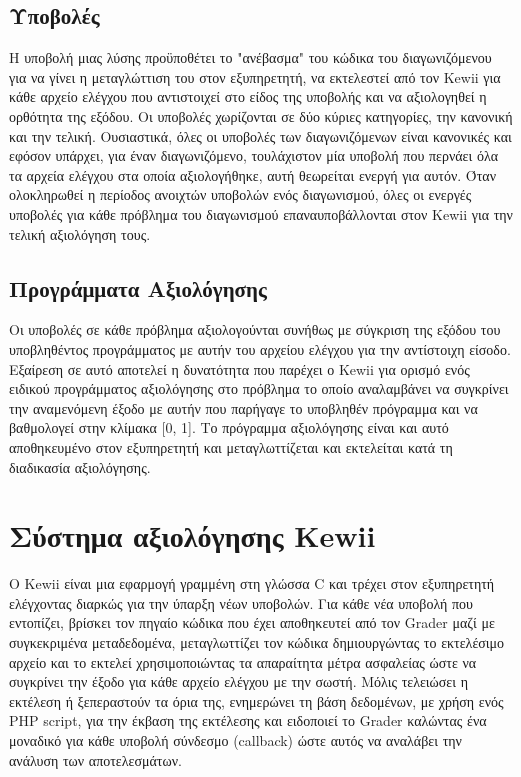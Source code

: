 \documentclass[diploma]{softlab-thesis}
\begin{document}
\subsection{Υποβολές}

Η υποβολή μιας λύσης προϋποθέτει το "ανέβασμα" του κώδικα του διαγωνιζόμενου για
να γίνει η μεταγλώττιση του στον εξυπηρετητή, να εκτελεστεί από τον Kewii για
κάθε αρχείο ελέγχου που αντιστοιχεί στο είδος της υποβολής και να αξιολογηθεί η
ορθότητα της εξόδου. Οι υποβολές χωρίζονται σε δύο κύριες κατηγορίες, την
κανονική και την τελική. Ουσιαστικά, όλες οι υποβολές των διαγωνιζόμενων είναι
κανονικές και εφόσον υπάρχει, για έναν διαγωνιζόμενο, τουλάχιστον μία υποβολή
που περνάει όλα τα αρχεία ελέγχου στα οποία αξιολογήθηκε, αυτή θεωρείται ενεργή
για αυτόν. Όταν ολοκληρωθεί η περίοδος ανοιχτών υποβολών ενός διαγωνισμού, όλες
οι ενεργές υποβολές για κάθε πρόβλημα του διαγωνισμού επαναυποβάλλονται στον
Kewii για την τελική αξιολόγηση τους.

\subsection{Προγράμματα Αξιολόγησης}

Οι υποβολές σε κάθε πρόβλημα αξιολογούνται συνήθως με σύγκριση της εξόδου του
υποβληθέντος προγράμματος με αυτήν του αρχείου ελέγχου για την αντίστοιχη
είσοδο. Εξαίρεση σε αυτό αποτελεί η δυνατότητα που παρέχει ο Kewii για ορισμό
ενός ειδικού προγράμματος αξιολόγησης στο πρόβλημα το οποίο αναλαμβάνει να
συγκρίνει την αναμενόμενη έξοδο με αυτήν που παρήγαγε το υποβληθέν πρόγραμμα
και να βαθμολογεί στην κλίμακα [0, 1]. Το πρόγραμμα αξιολόγησης είναι και αυτό
αποθηκευμένο στον εξυπηρετητή και μεταγλωττίζεται και εκτελείται κατά τη
διαδικασία αξιολόγησης.

\section{Σύστημα αξιολόγησης Kewii}

Ο Kewii είναι μια εφαρμογή γραμμένη στη γλώσσα C και τρέχει στον εξυπηρετητή
ελέγχοντας διαρκώς για την ύπαρξη νέων υποβολών. Για κάθε νέα υποβολή που εντοπίζει,
βρίσκει τον πηγαίο κώδικα που έχει αποθηκευτεί από τον Grader μαζί με συγκεκριμένα
μεταδεδομένα, μεταγλωττίζει τον κώδικα δημιουργώντας το εκτελέσιμο αρχείο και το
εκτελεί χρησιμοποιώντας τα απαραίτητα μέτρα ασφαλείας ώστε να συγκρίνει την έξοδο
για κάθε αρχείο ελέγχου με την σωστή. Μόλις τελειώσει η εκτέλεση ή ξεπεραστούν τα
όρια της, ενημερώνει τη βάση δεδομένων, με χρήση ενός PHP script, για την έκβαση της
εκτέλεσης και ειδοποιεί το Grader καλώντας ένα μοναδικό για κάθε υποβολή σύνδεσμο
(callback) ώστε αυτός να αναλάβει την ανάλυση των αποτελεσμάτων.
\end{document}
